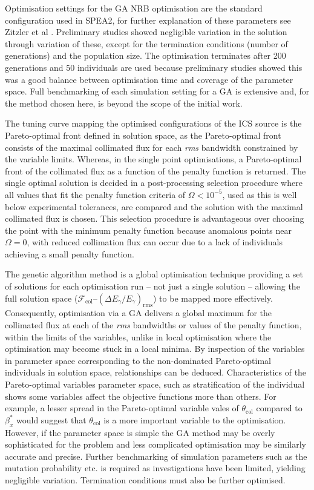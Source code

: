\documentclass[../main.tex]{subfiles}
\begin{document}
Optimisation settings for the GA NRB optimisation are the standard configuration used in \textsc{SPEA2}, for further explanation of these parameters see Zitzler et al \cite{zitzler2001spea2}. Preliminary studies showed negligible variation in the solution through variation of these, except for the termination conditions (number of generations) and the population size. The optimisation terminates after 200 generations and 50 individuals are used because preliminary studies showed this was a good balance between optimisation time and coverage of the parameter space. Full benchmarking of each simulation setting for a GA is extensive and, for the method chosen here, is beyond the scope of the initial work. 

The tuning curve mapping the optimised configurations of the ICS source is the Pareto-optimal front defined in solution space, as the Pareto-optimal front consists of the maximal collimated flux for each \textit{rms} bandwidth constrained by the variable limits. Whereas, in the single point optimisations, a Pareto-optimal front of the collimated flux as a function of the penalty function is returned. The single optimal solution is decided in a post-processing selection procedure where all values that fit the penalty function criteria of $\Omega < 10^{-5}$, used as this is well below experimental tolerances, are compared and the solution with the maximal collimated flux is chosen. This selection procedure is advantageous over choosing the point with the minimum penalty function because anomalous points near $\Omega = 0$, with reduced collimation flux can occur due to a lack of individuals achieving a small penalty function.          

The genetic algorithm method is a global optimisation technique providing a set of solutions for each optimisation run -- not just a single solution -- allowing the full solution space ($\mathcal{F}_{\mathrm{col}}$--$\left(\Delta E_{\gamma}/E_{\gamma}\right)_{\mathrm{rms}}$) to be mapped more effectively. Consequently, optimisation via a GA delivers a global maximum for the collimated flux at each of the \textit{rms} bandwidths or values of the penalty function, within the limits of the variables, unlike in local optimisation where the optimisation may become stuck in a local minima. By inspection of the variables in parameter space corresponding to the non-dominated Pareto-optimal individuals in solution space, relationships can be deduced. Characteristics of the Pareto-optimal variables parameter space, such as stratification of the individual shows some variables affect the objective functions more than others. For example, a lesser spread in the Pareto-optimal variable vales of $\theta_{\mathrm{col}}$ compared to $\beta_{x}^{*}$ would suggest that $\theta_{\mathrm{col}}$ is a more important variable to the optimisation. However, if the parameter space is simple the GA method may be overly sophisticated for the problem and less complicated optimisation may be similarly accurate and precise. Further benchmarking of simulation parameters such as the mutation probability etc. is required as investigations have been limited, yielding negligible variation. Termination conditions must also be further optimised. 
\end{document}
